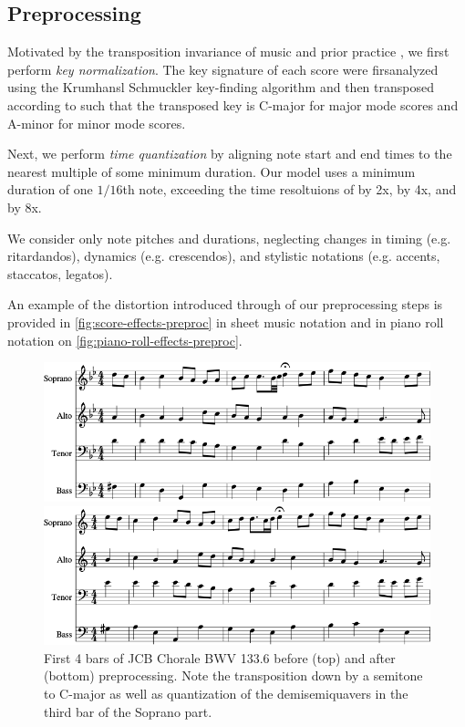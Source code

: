 \subsection{Preprocessing}

Motivated by the transposition invariance of music and prior practice
\citep{mozer1994neural} \citep{Eck2002} \citep{franklin2004recurrent}
\citep{franklin2005jazz}, we first perform \emph{key normalization}.
The key signature of each score were firsanalyzed using the Krumhansl
Schmuckler key-finding algorithm \citep{krumhansl2001cognitive} and then
transposed according to  such that the transposed key is
C-major for major mode scores and A-minor for minor mode scores.

Next, we perform \emph{time quantization} by aligning note start and end times
to the nearest multiple of some minimum duration. Our model uses a minimum
duration of one $1/16$th note, exceeding the time resoltuions of
\citep{Boulanger-Lewandowski2012} \citep{Eck2002} by 2x,
\citep{hild1991harmonet} by 4x, and \citep{bellgard1994harmonizing} by 8x.

We consider only note pitches and durations, neglecting changes in timing
(e.g. ritardandos), dynamics (e.g. crescendos), and stylistic notations (e.g.
accents, staccatos, legatos).

An example of the distortion introduced through of our preprocessing steps is
provided in \vref{fig:score-effects-preproc} in sheet music notation and in
piano roll notation on
\vref{fig:piano-roll-effects-preproc}.
\begin{figure}[p]
    \centering
    \includegraphics[width=0.8\linewidth]{bwv185-6-original-score-1.png}

    \vspace{1.5cm}

    \includegraphics[width=0.8\linewidth]{bwv185-6-preproc-score-1.png}
    \caption{First 4 bars of JCB Chorale BWV 133.6 before (top) and after (bottom) preprocessing. Note
    the transposition down by a semitone to C-major as well as quantization of the
    demisemiquavers in the third bar of the Soprano part.}
    \label{fig:score-effects-preproc}
\end{figure}

